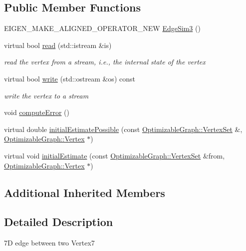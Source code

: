 \subsection*{Public Member Functions}
\begin{DoxyCompactItemize}
\item 
E\+I\+G\+E\+N\+\_\+\+M\+A\+K\+E\+\_\+\+A\+L\+I\+G\+N\+E\+D\+\_\+\+O\+P\+E\+R\+A\+T\+O\+R\+\_\+\+N\+EW \mbox{\hyperlink{classg2o_1_1_edge_sim3_a5a558abf78a1213044e60993f8c8c6d3}{Edge\+Sim3}} ()
\item 
virtual bool \mbox{\hyperlink{classg2o_1_1_edge_sim3_a6c7ad669fa04265475cbfdba3452fcbd}{read}} (std\+::istream \&is)
\begin{DoxyCompactList}\small\item\em read the vertex from a stream, i.\+e., the internal state of the vertex \end{DoxyCompactList}\item 
virtual bool \mbox{\hyperlink{classg2o_1_1_edge_sim3_ae1f72205352bf73156b70080ecfa235b}{write}} (std\+::ostream \&os) const
\begin{DoxyCompactList}\small\item\em write the vertex to a stream \end{DoxyCompactList}\item 
void \mbox{\hyperlink{classg2o_1_1_edge_sim3_a68f55d11f6b8b210318f167d04722a8b}{compute\+Error}} ()
\item 
virtual double \mbox{\hyperlink{classg2o_1_1_edge_sim3_a0fd73623327838b46abdf292582da6ae}{initial\+Estimate\+Possible}} (const \mbox{\hyperlink{classg2o_1_1_hyper_graph_a703938cdb4bb636860eed55a2489d70c}{Optimizable\+Graph\+::\+Vertex\+Set}} \&, \mbox{\hyperlink{classg2o_1_1_optimizable_graph_1_1_vertex}{Optimizable\+Graph\+::\+Vertex}} $\ast$)
\item 
virtual void \mbox{\hyperlink{classg2o_1_1_edge_sim3_afac4cc093af6f54adb278c142f33dcca}{initial\+Estimate}} (const \mbox{\hyperlink{classg2o_1_1_hyper_graph_a703938cdb4bb636860eed55a2489d70c}{Optimizable\+Graph\+::\+Vertex\+Set}} \&from, \mbox{\hyperlink{classg2o_1_1_optimizable_graph_1_1_vertex}{Optimizable\+Graph\+::\+Vertex}} $\ast$)
\end{DoxyCompactItemize}
\subsection*{Additional Inherited Members}


\subsection{Detailed Description}
7D edge between two Vertex7 

